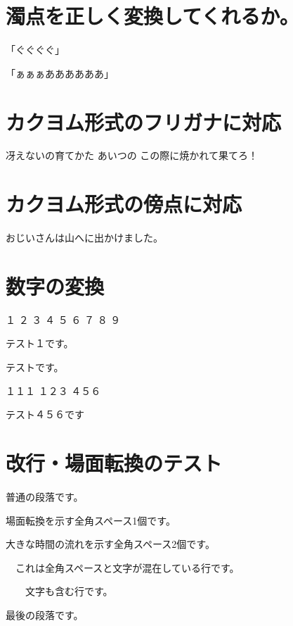 \hypertarget{ux6fc1ux70b9ux3092ux6b63ux3057ux304fux5909ux63dbux3057ux3066ux304fux308cux308bux304b}{%
\section{濁点を正しく変換してくれるか。}\label{ux6fc1ux70b9ux3092ux6b63ux3057ux304fux5909ux63dbux3057ux3066ux304fux308cux308bux304b}}

「ぐぐぐぐ」

「ぁぁぁああああああ」

\hypertarget{ux30abux30afux30e8ux30e0ux5f62ux5f0fux306eux30d5ux30eaux30acux30caux306bux5bfeux5fdc}{%
\section{カクヨム形式のフリガナに対応}\label{ux30abux30afux30e8ux30e0ux5f62ux5f0fux306eux30d5ux30eaux30acux30caux306bux5bfeux5fdc}}

冴えないの育てかた
あいつの
この際に焼かれて果てろ！

\hypertarget{ux30abux30afux30e8ux30e0ux5f62ux5f0fux306eux508dux70b9ux306bux5bfeux5fdc}{%
\section{カクヨム形式の傍点に対応}\label{ux30abux30afux30e8ux30e0ux5f62ux5f0fux306eux508dux70b9ux306bux5bfeux5fdc}}

おじいさんは山へに出かけました。

\hypertarget{ux6570ux5b57ux306eux5909ux63db}{%
\section{数字の変換}\label{ux6570ux5b57ux306eux5909ux63db}}

１ ２ ３ ４ ５ ６ ７ ８ ９

テスト１です。

{\small{}} {\small{}} {\small{}}

テスト{\small{}}です。

１１１ １２３ ４５６

テスト４５６です

\hypertarget{ux6539ux884cux5834ux9762ux8ee2ux63dbux306eux30c6ux30b9ux30c8}{%
\section{改行・場面転換のテスト}\label{ux6539ux884cux5834ux9762ux8ee2ux63dbux306eux30c6ux30b9ux30c8}}

普通の段落です。

\vspace{1\baselineskip}

場面転換を示す全角スペース1個です。

\vspace{2\baselineskip}

大きな時間の流れを示す全角スペース2個です。

　これは全角スペースと文字が混在している行です。

　　文字も含む行です。

最後の段落です。
